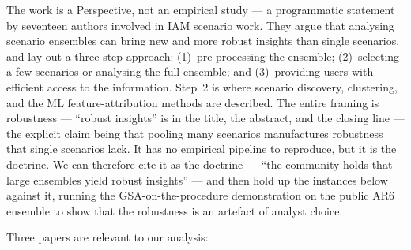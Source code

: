 \documentclass[sn-basic]{sn-jnl}%
\begin{document}
\bigskip

The work
\cite{Guivarch_Le_Gallic_Bauer_Fragkos_Huppmann_Jaxa-Rozen_Keppo_Kriegler_Krisztin_Marangoni_et_al._2022}
is a Perspective, not an empirical study --- a programmatic statement by
seventeen authors involved in IAM scenario work. They argue that analysing
scenario ensembles can bring new and more robust insights than single
scenarios, and lay out a three-step approach: (1)~pre-processing the ensemble;
(2)~selecting a few scenarios or analysing the full ensemble; and
(3)~providing users with efficient access to the information. Step~2 is where
scenario discovery, clustering, and the ML feature-attribution methods are
described. The entire framing is robustness --- ``robust insights'' is in the
title, the abstract, and the closing line --- the explicit claim being that
pooling many scenarios manufactures robustness that single scenarios lack. It
has no empirical pipeline to reproduce, but it is the doctrine.
We can therefore cite it as the doctrine --- ``the community
holds that large ensembles yield robust insights'' --- and then hold up the
instances below against it, running the GSA-on-the-procedure demonstration on
the public AR6 ensemble to show that the robustness is an artefact of analyst
choice.


\bigskip

Three papers are relevant to our analysis:
\end{document}
